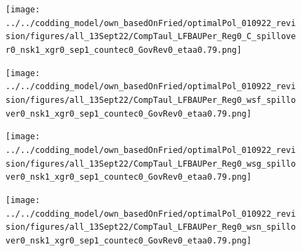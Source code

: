 \begin{figure}[h!!]
\begin{minipage}[]{0.32\textwidth}
	\end{minipage}		
	\begin{minipage}[]{0.32\textwidth}
		\texttt{[image: ../../codding\_model/own\_basedOnFried/optimalPol\_010922\_revision/figures/all\_13Sept22/CompTaul\_LFBAUPer\_Reg0\_C\_spillover0\_nsk1\_xgr0\_sep1\_countec0\_GovRev0\_etaa0.79.png]}
	\end{minipage}	
	\begin{minipage}[]{0.32\textwidth}
		\texttt{[image: ../../codding\_model/own\_basedOnFried/optimalPol\_010922\_revision/figures/all\_13Sept22/CompTaul\_LFBAUPer\_Reg0\_wsf\_spillover0\_nsk1\_xgr0\_sep1\_countec0\_GovRev0\_etaa0.79.png]}
	\end{minipage}		
	\begin{minipage}[]{0.32\textwidth}
		\texttt{[image: ../../codding\_model/own\_basedOnFried/optimalPol\_010922\_revision/figures/all\_13Sept22/CompTaul\_LFBAUPer\_Reg0\_wsg\_spillover0\_nsk1\_xgr0\_sep1\_countec0\_GovRev0\_etaa0.79.png]}
	\end{minipage}		
	\begin{minipage}[]{0.32\textwidth}
		\texttt{[image: ../../codding\_model/own\_basedOnFried/optimalPol\_010922\_revision/figures/all\_13Sept22/CompTaul\_LFBAUPer\_Reg0\_wsn\_spillover0\_nsk1\_xgr0\_sep1\_countec0\_GovRev0\_etaa0.79.png]}
	\end{minipage}	
\end{figure}

